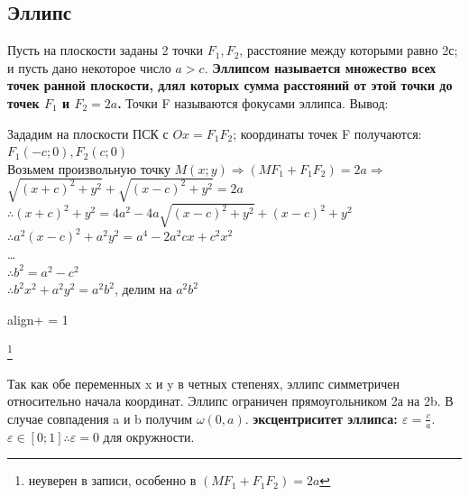 \documentclass[oneside]{book}
\newcommand{\boxedeq}[2]{\begin{empheq}[box={\fboxsep=6pt\fbox}]{align}\label{#1}#2\end{empheq}}
\begin{document}
\subsection{Эллипс}
Пусть на плоскости заданы 2 точки $F_1, F_2$, расстояние между которыми равно 2с; и пусть дано
некоторое число $a > c$. \textbf{Эллипсом называется множество всех точек ранной плоскости, длял которых
сумма расстояний от этой точки до точек $F_1$ и $F_2 = 2a$.} Точки F называются фокусами эллипса. Вывод:
\begin{center}
        Зададим на плоскости ПСК с $Ox = F_1F_2$; координаты точек F получаются: $F_1(-c; 0), F_2(c; 0)$ \\
        Возьмем произвольную точку $M(x; y) \Rightarrow (MF_1 + F_1F_2) = 2a \Rightarrow$ \\
        $\sqrt{(x+c)^2 + y^2} + \sqrt{(x-c)^2 + y^2} = 2a$ \\
        $\therefore (x+c)^2 + y^2 = 4a^2 - 4a\sqrt{(x-c)^2 + y^2} + (x-c)^2 + y^2$ \\
        $\therefore a^2(x-c)^2+a^2y^2 = a^4 - 2a^2cx+c^2x^2$ \\
        \dots \\
        $\therefore b^2 = a^2 - c^2$ \\
        $\therefore b^2x^2 + a^2y^2 = a^2b^2$, делим на $a^2b^2$ \\
        \boxedeq{eq:*}{+ = 1}\footnote{неуверен в записи, особенно в $(MF_1 + F_1F_2) = 2a$}
\end{center}
Так как обе переменных x и y в четных степенях, эллипс симметричен относительно начала координат.
Эллипс ограничен прямоугольником 2а на 2b. В случае совпадения a и b получим $\omega(0, a)$.
\textbf{эксцентриситет эллипса: $\varepsilon = \frac{c}{a}$}. $\varepsilon \in [0; 1] \therefore \varepsilon = 0$ для окружности.
\end{document}
